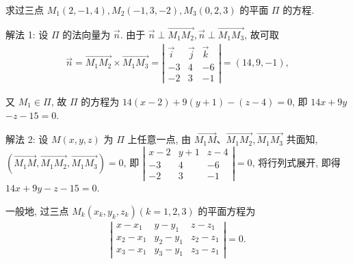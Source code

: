 \begin{example}
	求过三点 $M_1(2,-1,4), M_2(-1,3,-2), M_3(0,2,3)$ 的平面 $\Pi$ 的方程.
\end{example}
\begin{solution}
	解法 1: 设 $\Pi$ 的法向量为 $\vec{n}$. 由于 $\vec{n} \perp \overrightarrow{M_1 M_2}, \vec{n} \perp \overrightarrow{M_1 M_3}$, 故可取
	\begin{align*}
		\vec{n}=\overrightarrow{M_1 M_2} \times \overrightarrow{M_1 M_3}=\left|\begin{array}{ccc}
			                                                                       \vec{i} & \vec{j} & \vec{k} \\
			                                                                       -3      & 4       & -6      \\
			                                                                       -2      & 3       & -1
		                                                                       \end{array}\right|=(14,9,-1),
	\end{align*}

	又 $M_1 \in \Pi$, 故 $\Pi$ 的方程为 $14(x-2)+9(y+1)-(z-4)=0$, 即 $14 x+9 y$ $-z-15=0$.

	解法 2: 设 $M(x, y, z)$ 为 $\Pi$ 上任意一点, 由 $\overrightarrow{M_1 M} 、 \overrightarrow{M_1 M_2}, \overrightarrow{M_1 M_3}$ 共面知, $\left(\overrightarrow{M_1 M}, \overrightarrow{M_1 M_2}, \overrightarrow{M_1 M_3}\right)=0$, 即 $\left|\begin{array}{ccc}x-2 & y+1 & z-4 \\ -3 & 4 & -6 \\ -2 & 3 & -1\end{array}\right|=0$, 将行列式展开, 即得 $14 x+9 y-z-15=0$.
\end{solution}
\begin{note}
	一般地, 过三点 $M_k\left(x_k, y_k, z_k\right)(k=1,2,3)$ 的平面方程为
	\begin{align*}
		\left|\begin{array}{ccc}
			      x-x_1   & y-y_1   & z-z_1   \\
			      x_2-x_1 & y_2-y_1 & z_2-z_1 \\
			      x_3-x_1 & y_3-y_1 & z_3-z_1
		      \end{array}\right|=0 .
	\end{align*}
\end{note}

